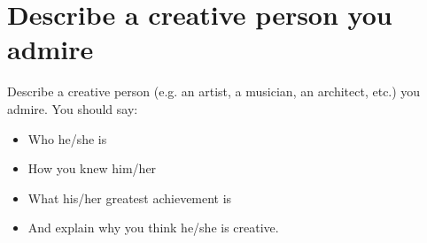 \section{Describe a creative person you admire}
\begin{ieltsprompt}
Describe a creative person (e.g. an artist, a musician, an architect, etc.) you admire.
You should say:
\begin{itemize}[leftmargin=2em, itemsep=2pt]
\item Who he/she is
\item How you knew him/her
\item What his/her greatest achievement is
\item And explain why you think he/she is creative.
\end{itemize}
\end{ieltsprompt}
